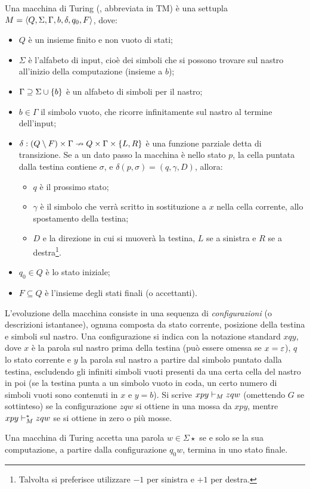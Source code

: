 \begin{defin}
	Una macchina di Turing (, abbreviata in TM) è una settupla $M=\langle Q,\Sigma,\Gamma,b,\delta,q_0,F \rangle$, dove:
	\begin{itemize}
		\item $Q$ è un insieme finito e non vuoto di stati;
		\item $\Sigma$ è l'alfabeto di input, cioè dei simboli che si possono trovare sul nastro all'inizio della computazione (insieme a $b$);
		\item $\Gamma\supseteq\Sigma\cup\left\{ b \right\}$ è un alfabeto di simboli per il nastro;
		\item $b\in\Gamma$ il simbolo vuoto, che ricorre infinitamente sul nastro al termine dell'input;
		\item $\delta:(Q\setminus F)\times\Gamma\nrightarrow Q\times\Gamma\times\left\{ L,R \right\}$ è una funzione parziale detta di transizione. Se a un dato passo la macchina è nello stato $p$, la cella puntata dalla testina contiene $\sigma$, e $\delta(p,\sigma)=(q,\gamma,D)$, allora:
		      \begin{itemize}
			      \item $q$ è il prossimo stato;
			      \item $\gamma$ è il simbolo che verrà scritto in sostituzione a $x$ nella cella corrente, allo spostamento della testina;
			      \item $D$ e la direzione in cui si muoverà la testina, $L$ se a sinistra e $R$ se a destra\footnote{Talvolta si preferisce utilizzare $-1$ per sinistra e $+1$ per destra.}.
		      \end{itemize}
		\item $q_0\in Q$ è lo stato iniziale;
		\item $F\subseteq Q$ è l'insieme degli stati finali (o accettanti).
	\end{itemize}
	L'evoluzione della macchina consiste in una sequenza di \emph{configurazioni} (o descrizioni istantanee), ognuna composta da stato corrente, posizione della testina e simboli sul nastro. Una configurazione si indica con la notazione standard $xqy$, dove $x$ è la parola sul nastro prima della testina (può essere omessa se $x=\varepsilon$), $q$ lo stato corrente e $y$ la parola sul nastro a partire dal simbolo puntato dalla testina, escludendo gli infiniti simboli vuoti presenti da una certa cella del nastro in poi (se la testina punta a un simbolo vuoto in coda, un certo numero di simboli vuoti sono contenuti in $x$ e $y=b$). Si scrive $xpy\vdash_{M} zqw$ (omettendo $G$ se sottinteso) se la configurazione $zqw$ si ottiene in una mossa da $xpy$, mentre $xpy\vdash_{M}^* zqw$ se si ottiene in zero o più mosse.

	Una macchina di Turing accetta una parola $w\in\Sigma\star$ se e solo se la sua computazione, a partire dalla configurazione $q_0w$, termina in uno stato finale.
\end{defin}


